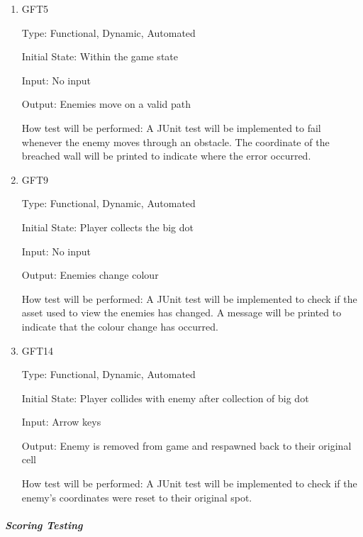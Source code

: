 \documentclass[12pt, titlepage]{article}
\begin{document}
\begin{enumerate}

\item{GFT5\\}

Type: Functional, Dynamic, Automated
					
Initial State: Within the game state
					
Input: No input
					
Output: Enemies move on a valid path

How test will be performed: A JUnit test will be implemented to fail whenever the enemy moves through an obstacle. The coordinate of the breached wall will be printed to indicate where the error occurred.

\item{GFT9\\}

Type: Functional, Dynamic, Automated
					
Initial State: Player collects the big dot
					
Input: No input
					
Output: Enemies change colour

How test will be performed: A JUnit test will be implemented to check if the asset used to view the enemies has changed. A message will be printed to indicate that the colour change has occurred.

\item{GFT14\\}

Type: Functional, Dynamic, Automated
					
Initial State: Player collides with enemy after collection of big dot
					
Input: Arrow keys
					
Output: Enemy is removed from game and respawned back to their original cell

How test will be performed: A JUnit test will be implemented to check if the enemy's coordinates were reset to their original spot.

\end{enumerate}

\subparagraph{Scoring Testing}
\end{document}

